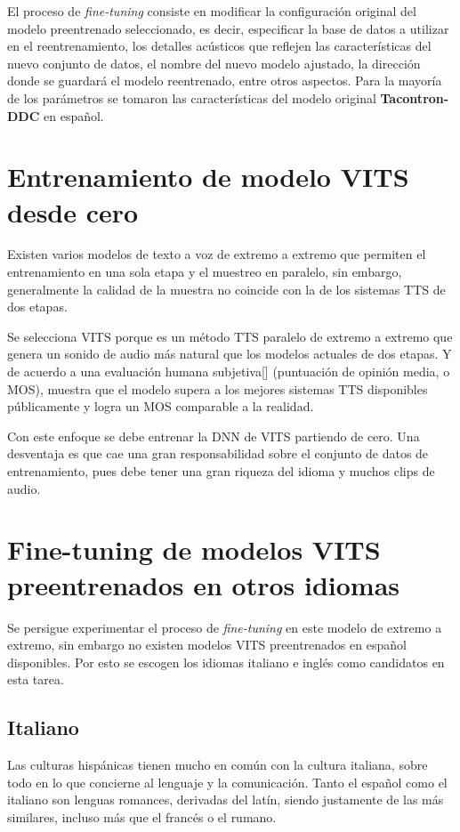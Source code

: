El proceso de \textit{fine-tuning} consiste en modificar la configuración original del modelo preentrenado seleccionado, es decir, especificar la base de datos a utilizar en el reentrenamiento, los detalles acústicos que reflejen las características del nuevo conjunto de datos, el nombre del nuevo modelo ajustado, la dirección donde se guardará el modelo reentrenado, entre otros aspectos. Para la mayoría de los parámetros se tomaron las características del modelo original \textbf{Tacontron-DDC} en español.


\section{Entrenamiento de modelo VITS desde cero} \label{vits-sandra}

Existen varios modelos de texto a voz de extremo a extremo que permiten el entrenamiento en una sola etapa y el muestreo en paralelo, sin embargo, generalmente la calidad de la muestra no coincide con la de los sistemas TTS de dos etapas. 

Se selecciona VITS porque es un método TTS paralelo de extremo a extremo que genera un sonido de audio más natural que los modelos actuales de dos etapas. Y de acuerdo a una evaluación humana subjetiva[\cite{mos}] (puntuación de opinión media, o MOS), muestra que el modelo supera a los mejores sistemas TTS disponibles públicamente y logra un MOS comparable a la realidad.

Con este enfoque se debe entrenar la DNN de VITS partiendo de cero. Una desventaja es que cae una gran responsabilidad sobre el conjunto de datos de entrenamiento, pues debe tener una gran riqueza del idioma y muchos clips de audio.
	
	
\section{Fine-tuning de modelos VITS preentrenados en otros idiomas} \label{it-en}

Se persigue experimentar el proceso de \textit{fine-tuning} en este modelo de extremo a extremo, sin embargo no existen modelos VITS preentrenados en español disponibles. Por esto se escogen los idiomas italiano e inglés como candidatos en esta tarea.

\subsection{Italiano} 
Las culturas hispánicas tienen mucho en común con la cultura italiana, sobre todo en lo que concierne al lenguaje y la comunicación. Tanto el español como el italiano son lenguas romances, derivadas del latín, siendo justamente de las más similares, incluso más que el francés o el rumano.

